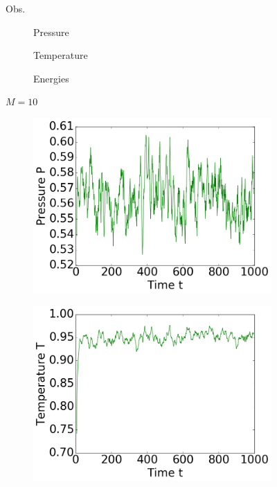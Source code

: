\begin{figure}[ht]
Obs.
\hfill
\begin{subfigure}{0.3\textwidth}
\centering
Pressure
\end{subfigure}
\hfill
\begin{subfigure}{0.3\textwidth}
\centering
Temperature
\end{subfigure}
\hfill
\begin{subfigure}{0.3\textwidth}
\centering
Energies
\end{subfigure}

$M=10$
\hfill
\begin{subfigure}{0.28\textwidth}
\includegraphics[width=\textwidth]{../dat/avPressure_M10.png}
\end{subfigure}
\hfill
\begin{subfigure}{0.28\textwidth}
\includegraphics[width=\textwidth]{../dat/avTemperature_M10.png}

\end{subfigure}
\end{figure}
